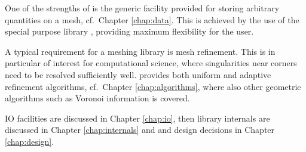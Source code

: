 One of the strengths of {\ViennaGrid} is the generic facility provided for storing arbitrary quantities on a mesh, cf.~Chapter \ref{chap:data}. This is achieved by the use of the special purpose library {\ViennaData} \cite{ViennaData}, providing maximum flexibility for the user.

A typical requirement for a meshing library is mesh refinement. This is in particular of interest for computational science, where singularities near corners need to be resolved sufficiently well. {\ViennaGrid} provides both uniform and adaptive refinement algorithms, cf.~Chapter \ref{chap:algorithms}, where also other geometric algorithms such as Voronoi information is covered.

IO facilities are discussed in Chapter \ref{chap:io}, then library internals are discussed in Chapter \ref{chap:internals} and and design decisions in Chapter \ref{chap:design}.

